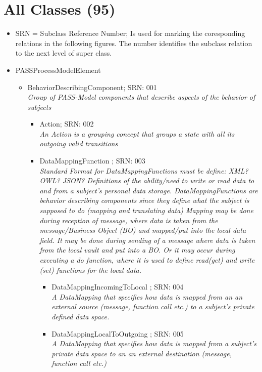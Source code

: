 
\section{All Classes (95)}

\footnotesize

\begin{itemize}
	\item SRN = Subclass Reference Number; Is used for marking the coresponding relations in the following figures. The number identifies the subclass relation to the next level of super class.
	\item PASSProcessModelElement
	\begin{itemize}
		\item BehaviorDescribingComponent; SRN: 001 \\  \textit{Group of PASS-Model components that describe aspects of the behavior of subjects}
		\begin{itemize}
			\item Action; SRN: 002 \\ \textit{An Action is a grouping concept that groups a state with all its outgoing valid transitions}
			\item DataMappingFunction ; SRN: 003 \\ \textit{Standard Format for DataMappingFunctions must be define: XML? OWL? JSON? 
				Definitions of the ability/need to write or read data to and from a subject's personal data storage.
				DataMappingFunctions are behavior describing components since they define what the subject is supposed to do (mapping and translating data)
				Mapping may be done during reception of message, where data is taken from the message/Business Object (BO) and mapped/put into the local data field.
				It may be done during sending of a message where data is taken from the local vault and put into a BO.
				Or it may occur during executing a do function, where it is used to define read(get) and write (set) functions for the local data.}
			\begin{itemize}
				\item DataMappingIncomingToLocal ; SRN: 004 \\ \textit{A DataMapping that specifies how data is mapped from an an external source (message, function call etc.) to a subject's private defined data space.}
				\item DataMappingLocalToOutgoing ; SRN: 005 \\ \textit{A DataMapping that specifies how data is mapped from a subject's private data space to an an external destination (message, function call etc.)}

\end{itemize}
\end{itemize}
\end{itemize}
\end{itemize}
